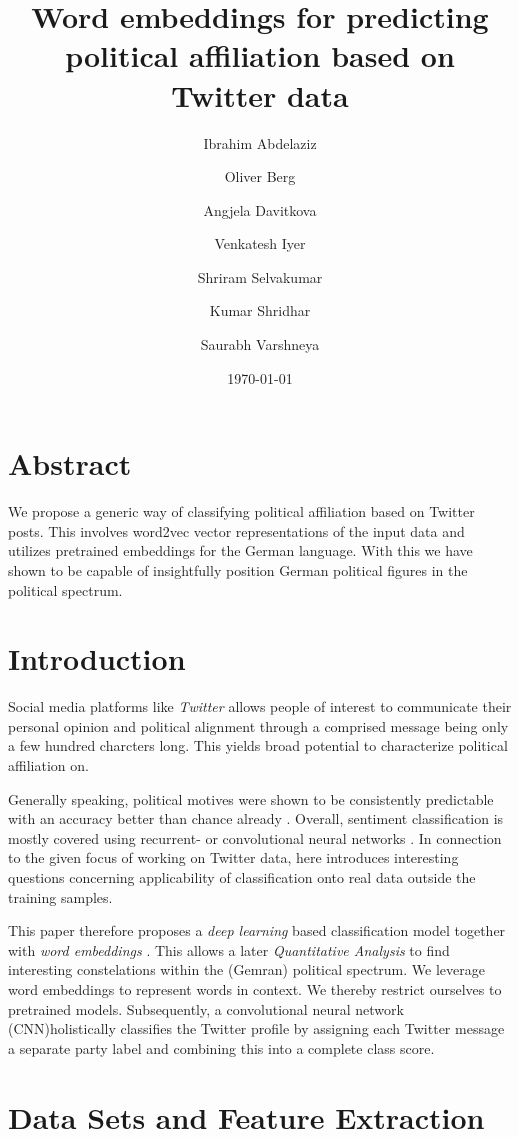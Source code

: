 \documentclass[10pt, oneside]{article}
\title{Word embeddings for predicting political affiliation based on Twitter data}
\author[]{Ibrahim Abdelaziz}
\author[]{Oliver Berg}
\author[]{Angjela Davitkova}
\author[]{Venkatesh Iyer}
\author[]{Shriram Selvakumar}
\author[]{Kumar Shridhar}
\author[]{Saurabh Varshneya}
\affil[1]{Technische Universität Kaiserslautern}
\date{\today}
\begin{document}
\maketitle
\begin{multicols}{2}


\section{Abstract}

We propose a generic way of classifying political affiliation based on Twitter posts. This involves word2vec vector representations of the input data and utilizes pretrained embeddings for the German language. With this we have shown to be capable of insightfully position German political figures in the political spectrum. 


\section{Introduction}

Social media platforms like \emph{Twitter} allows people of interest to communicate their personal opinion and political alignment through a comprised message being only a few hundred charcters long. This yields broad potential to characterize political affiliation on.

Generally speaking, political motives were shown to be consistently predictable with an accuracy better than chance already \cite{Biessmann2017}. Overall, sentiment classification is mostly covered using recurrent- or convolutional neural networks \cite{Kim2014}. In connection to the given focus of working on Twitter data, \cite{Cohen2013} here introduces interesting questions concerning applicability of classification onto real data outside the training samples.

This paper therefore proposes a \emph{deep learning} based classification model together with \emph{word embeddings} \cite{Pelevinala2016}. This allows a later \emph{Quantitative Analysis} to find interesting constelations within the (Gemran) political spectrum.
We leverage word embeddings to represent words in context. We thereby restrict ourselves to pretrained models. Subsequently, a convolutional neural network (CNN)holistically classifies the Twitter profile by assigning each Twitter message a separate party label and combining this into a complete class score.  


\section{Data Sets and Feature Extraction} 


\end{multicols}
\end{document}
